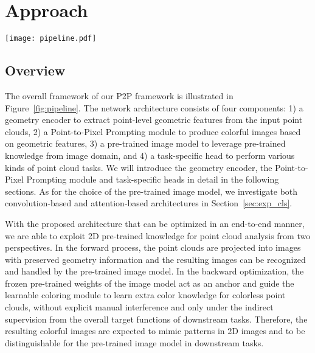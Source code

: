 \documentclass{article}
\begin{document}
\section{Approach}

\begin{figure*}[tb]
	\centering
	\texttt{[image: pipeline.pdf]}
	\caption{\small \textbf{The pipeline of our proposed P2P framework.} Taking a point cloud  as the input, we first encode the geometry information for each point. Then we sample a projection view and rearrange the point-wise features into an image-style layout to obtain the pixel-wise features with \textit{Geometry-preserved Projection}. The colorless projection will be enriched to produce a colorful image  with the color information via a learnable \textit{Coloring Module}. Our P2P framework can be easily transferred to several downstream tasks with a task-specific head with the help of the transferable visual knowledge from the pre-trained image model. We take the classical Vision Transformer~\cite{dosovitskiy2020vit} as our pre-trained image model for illustration in this pipeline.}
	\label{fig:pipeline}
\end{figure*}


\subsection{Overview}

The overall framework of our P2P framework is illustrated in Figure~\ref{fig:pipeline}. The network architecture consists of four components: 1) a geometry encoder to extract point-level geometric features from the input point clouds, 2) a Point-to-Pixel Prompting module to produce colorful images based on geometric features, 3) a pre-trained image model to leverage pre-trained knowledge from image domain, and 4) a task-specific head to perform various kinds of point cloud tasks. We will introduce the geometry encoder, the Point-to-Pixel Prompting module and task-specific heads in detail in the following sections. As for the choice of the pre-trained image model, we investigate both convolution-based and attention-based architectures in Section~\ref{sec:exp_cls}.

With the proposed architecture that can be optimized in an end-to-end manner, we are able to exploit 2D pre-trained knowledge for point cloud analysis from two perspectives. In the forward process, the point clouds are projected into images with preserved geometry information and the resulting images can be recognized and handled by the pre-trained image model. In the backward optimization, the frozen pre-trained weights of the image model act as an anchor and guide the learnable coloring module to learn extra color knowledge for colorless point clouds, without explicit manual interference and only under the indirect supervision from the overall target functions of downstream tasks. Therefore, the resulting colorful images are expected to mimic patterns in 2D images and to be distinguishable for the pre-trained image model in downstream tasks.
\end{document}
